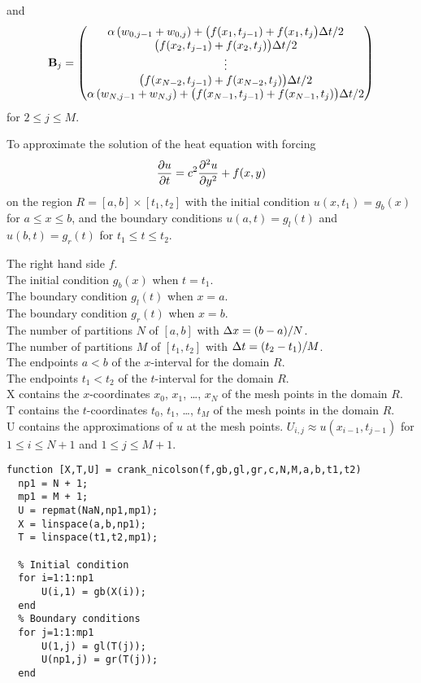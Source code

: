 and
\[
\mathbf{B}_j = \begin{pmatrix}
\alpha \left( w_{0,j-1} + w_{0,j} \right)
+ \big( f(x_1,t_{j-1}) +f(x_1,t_j\big) \Delta{t}/2 \\
\big( f(x_2,t_{j-1}) +f(x_2,t_j)\big) \Delta{t}/2 \\
\vdots \\
\big( f(x_{N-2},t_{j-1}) +f(x_{N-2},t_j)\big) \Delta{t}/2 \\
\alpha \left( w_{N,j-1} + w_{N,j} \right)
+ \big( f(x_{N-1},t_{j-1})+f(x_{N-1},t_j)\big) \Delta{t}/2
\end{pmatrix}
\]
for $2 \leq j \leq M$.

\begin{code}
To approximate the solution of the heat equation with forcing
\[
  \frac{\partial{u}}{\partial{t}} = c^2 \frac{\partial^{2}{u}}{\partial{y}^{2}} + f(x,y)
\]
on the region $R = [a,b]\times[t_1,t_2]$ with the initial condition
$u(x,t_1) = g_b(x)$ for $a \leq x \leq b$, and the boundary conditions
$u(a,t) = g_l(t)$ and $u(b,t) = g_r(t)$ for $t_1 \leq t \leq t_2$.

 The right hand side $f$.\\
The initial condition $g_b(x)$ when $t = t_1$.\\
The boundary condition $g_l(t)$ when $x = a$.\\
The boundary condition $g_r(t)$ when $x = b$.\\
The number of partitions $N$ of $[a,b]$ with $\Delta{x} = (b-a)/N$.\\
The number of partitions $M$ of $[t_1,t_2]$ with $\Delta{t} = (t_2-t_1)/M$.  \\
The endpoints $a < b$ of the $x$-interval for the domain $R$.\\
The endpoints $t_1 < t_2$ of the $t$-interval for the domain $R$.\\
X contains the $x$-coordinates $x_0$, $x_1$, \ldots, $x_N$ of the
mesh points in the domain $R$.\\
T contains the $t$-coordinates $t_0$, $t_1$, \ldots, $t_M$ of the
mesh points in the domain $R$.\\
U contains the approximations of $u$ at the mesh points.
$U_{i,j} \approx u(x_{i-1},t_{j-1})$ for $1\leq i \leq N+1$ and
$1 \leq j \leq M+1$.
\small
\begin{verbatim}
function [X,T,U] = crank_nicolson(f,gb,gl,gr,c,N,M,a,b,t1,t2)
  np1 = N + 1;
  mp1 = M + 1;
  U = repmat(NaN,np1,mp1);
  X = linspace(a,b,np1);
  T = linspace(t1,t2,mp1);

  % Initial condition
  for i=1:1:np1
      U(i,1) = gb(X(i));
  end
  % Boundary conditions
  for j=1:1:mp1
      U(1,j) = gl(T(j));
      U(np1,j) = gr(T(j));
  end


\end{verbatim}
\end{code}
